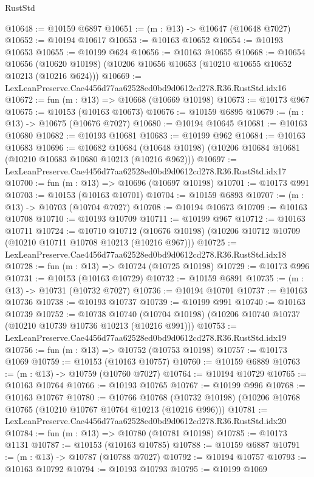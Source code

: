 \begin{lexlean}{RustStd}
\begin{coremodule}
@10648 := @10159 @6897
@10651 := (m : @13) -> @10647 (@10648 @7027)
@10652 := @10194 @10617
@10653 := @10163 @10652
@10654 := @10193 @10653
@10655 := @10199 @624
@10656 := @10163 @10655
@10668 := @10654
    @10656
    (@10620 @10198)
    (@10206 @10656 @10653 (@10210 @10655 @10652 @10213 (@10216 @624)))
@10669 := LexLeanPreserve.Cae4456d77aa62528ed0bd9d0612cd278.R36.RustStd.idx16
@10672 := fun (m : @13) => @10668 (@10669 @10198)
@10673 := @10173 @967
@10675 := @10153 (@10163 @10673)
@10676 := @10159 @6895
@10679 := (m : @13) -> @10675 (@10676 @7027)
@10680 := @10194 @10645
@10681 := @10163 @10680
@10682 := @10193 @10681
@10683 := @10199 @962
@10684 := @10163 @10683
@10696 := @10682
    @10684
    (@10648 @10198)
    (@10206 @10684 @10681 (@10210 @10683 @10680 @10213 (@10216 @962)))
@10697 := LexLeanPreserve.Cae4456d77aa62528ed0bd9d0612cd278.R36.RustStd.idx17
@10700 := fun (m : @13) => @10696 (@10697 @10198)
@10701 := @10173 @991
@10703 := @10153 (@10163 @10701)
@10704 := @10159 @6893
@10707 := (m : @13) -> @10703 (@10704 @7027)
@10708 := @10194 @10673
@10709 := @10163 @10708
@10710 := @10193 @10709
@10711 := @10199 @967
@10712 := @10163 @10711
@10724 := @10710
    @10712
    (@10676 @10198)
    (@10206 @10712 @10709 (@10210 @10711 @10708 @10213 (@10216 @967)))
@10725 := LexLeanPreserve.Cae4456d77aa62528ed0bd9d0612cd278.R36.RustStd.idx18
@10728 := fun (m : @13) => @10724 (@10725 @10198)
@10729 := @10173 @996
@10731 := @10153 (@10163 @10729)
@10732 := @10159 @6891
@10735 := (m : @13) -> @10731 (@10732 @7027)
@10736 := @10194 @10701
@10737 := @10163 @10736
@10738 := @10193 @10737
@10739 := @10199 @991
@10740 := @10163 @10739
@10752 := @10738
    @10740
    (@10704 @10198)
    (@10206 @10740 @10737 (@10210 @10739 @10736 @10213 (@10216 @991)))
@10753 := LexLeanPreserve.Cae4456d77aa62528ed0bd9d0612cd278.R36.RustStd.idx19
@10756 := fun (m : @13) => @10752 (@10753 @10198)
@10757 := @10173 @1069
@10759 := @10153 (@10163 @10757)
@10760 := @10159 @6889
@10763 := (m : @13) -> @10759 (@10760 @7027)
@10764 := @10194 @10729
@10765 := @10163 @10764
@10766 := @10193 @10765
@10767 := @10199 @996
@10768 := @10163 @10767
@10780 := @10766
    @10768
    (@10732 @10198)
    (@10206 @10768 @10765 (@10210 @10767 @10764 @10213 (@10216 @996)))
@10781 := LexLeanPreserve.Cae4456d77aa62528ed0bd9d0612cd278.R36.RustStd.idx20
@10784 := fun (m : @13) => @10780 (@10781 @10198)
@10785 := @10173 @1131
@10787 := @10153 (@10163 @10785)
@10788 := @10159 @6887
@10791 := (m : @13) -> @10787 (@10788 @7027)
@10792 := @10194 @10757
@10793 := @10163 @10792
@10794 := @10193 @10793
@10795 := @10199 @1069

\end{coremodule}
\end{lexlean}
